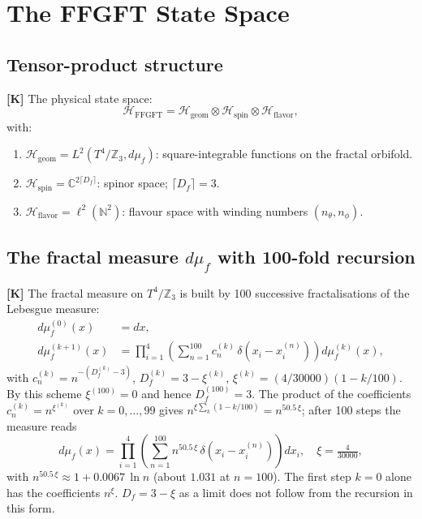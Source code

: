 \section{The FFGFT State Space}

\subsection{Tensor-product structure}

\textbf{[K]} The physical state space:
\begin{equation}
  \mathcal{H}_{\mathrm{FFGFT}}
  = \mathcal{H}_{\mathrm{geom}}
  \otimes \mathcal{H}_{\mathrm{spin}}
  \otimes \mathcal{H}_{\mathrm{flavor}},
\end{equation}
with:
\begin{enumerate}
  \item $\mathcal{H}_{\mathrm{geom}} = L^2(T^4/\mathbb{Z}_3, d\mu_f)$:
    square-integrable functions on the fractal orbifold.
  \item $\mathcal{H}_{\mathrm{spin}} = \mathbb{C}^{2\lceil D_f\rceil}$:
    spinor space; $\lceil D_f \rceil = 3$.
  \item $\mathcal{H}_{\mathrm{flavor}} = \ell^2(\mathbb{N}^2)$:
    flavour space with winding numbers $(n_\theta, n_\phi)$.
\end{enumerate}

\subsection{The fractal measure $d\mu_f$ with 100-fold recursion}

\textbf{[K]} The fractal measure on $T^4/\mathbb{Z}_3$ is built by
100 successive fractalisations of the Lebesgue measure:
\begin{align}
  d\mu_f^{(0)}(x) &= dx, \\
  d\mu_f^{(k+1)}(x) &= \prod_{i=1}^4
  \!\left(\sum_{n=1}^{100} c_n^{(k)}\,
  \delta\!\left(x_i - x_i^{(n)}\right)\right)
  d\mu_f^{(k)}(x),
\end{align}
with $c_n^{(k)} = n^{-(D_f^{(k)}-3)}$,
$D_f^{(k)} = 3-\xi^{(k)}$,
$\xi^{(k)} = (4/30000)(1-k/100)$.
By this scheme $\xi^{(100)} = 0$ and hence $D_f^{(100)} = 3$. The product
of the coefficients $c_n^{(k)} = n^{\xi^{(k)}}$ over $k = 0,\ldots,99$ gives
$n^{\xi\sum_k(1-k/100)} = n^{50.5\,\xi}$; after 100 steps the measure reads
\begin{equation}
  \boxed{d\mu_f(x)
  = \prod_{i=1}^4\!\left(\sum_{n=1}^{100} n^{50.5\,\xi}\,
  \delta\!\left(x_i-x_i^{(n)}\right)\right)dx_i},
  \quad \xi = \tfrac{4}{30000},
\end{equation}
with $n^{50.5\,\xi} \approx 1 + 0.0067\,\ln n$ (about $1.031$ at $n = 100$).
The first step $k = 0$ alone has the coefficients $n^{\xi}$.
$D_f = 3 - \xi$ as a limit does not follow from the recursion in this form.

